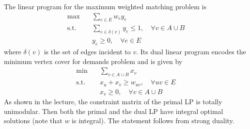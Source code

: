 \documentclass[11pt]{article}
\renewcommand{\leq}{\leqslant}
\renewcommand{\geq}{\geqslant}
\begin{document}
\begin{enumerate}[1)]
\begin{solution}
The linear program for the maximum weighted matching problem is
\begin{align*}
\max \quad & \sum_{e \in E} w_e y_e \\
\text{s.t.} \quad & \sum_{e \in \delta(v)} y_e \leq 1, \quad \forall v \in A \cup B \\
& y_e \geq 0, \quad \forall e \in E
\end{align*}
where $\delta(v)$ is the set of edges incident to $v$. 
Its dual linear program encodes the minimum vertex cover for demands problem and is given by
\begin{align*}
\min \quad & \sum_{v \in A \cup B} x_v \\
\text{s.t.} \quad & x_u + x_v \geq w_{uv}, \quad \forall uv \in E \\
& x_v \geq 0, \quad \forall v \in A \cup B
\end{align*}
As shown in the lecture, the constraint matrix of the primal LP is totally unimodular. Then both the primal and the dual LP have integral optimal solutions (note that $w$ is integral). The statement follows from strong duality.

\end{solution}

\end{enumerate}

  
\end{document}
